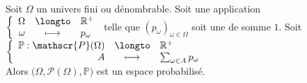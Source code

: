 \documentclass[11pt,a4paper,fleqn,pdftex]{report}
\begin{document}
\begin{itheorem}\label{thm:proba_famille_sommable}
     Soit $\Omega$ un univers fini ou dénombrable. \newline
     Soit une application $\left\lbrace \begin{array}{r c l} \Omega &\longto& \mathbb{R}^+ \\ \omega &\longmapsto& p_\omega \end{array}\right.$ telle que $(p_\omega)_{\omega\in\Omega}$ soit une  de somme $1$.\newline
     Soit $\left\lbrace \begin{array}{r c l} \mathbb{P} : \mathscr{P}(\Omega)&\longto& \mathbb{R}^+ \\ A &\longmapsto& \sum_{\omega \in A} p_\omega \end{array}\right.$\\
     Alors $\big( \Omega, \mathscr{P}(\Omega ), \mathbb{P}\big)$ est un espace probabilisé.
\end{itheorem}
\end{document}
